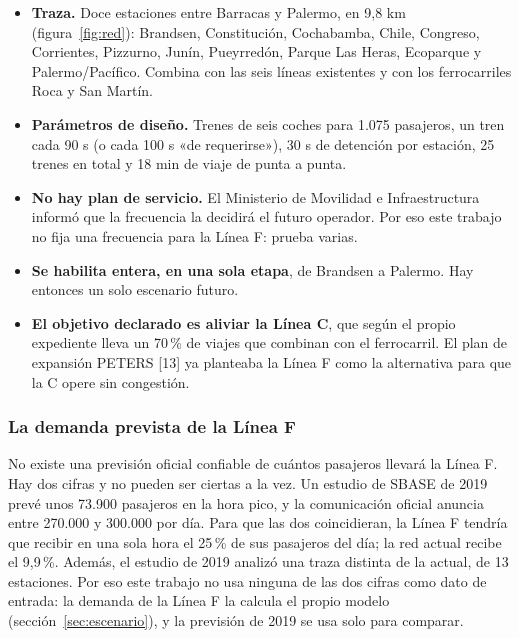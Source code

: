 \documentclass{article}
\begin{document}
\begin{itemize}
  \item \textbf{Traza.} Doce estaciones entre Barracas y Palermo, en 9,8 km (figura~\ref{fig:red}):
    Brandsen, Constitución, Cochabamba, Chile, Congreso, Corrientes, Pizzurno, Junín, Pueyrredón, Parque Las
    Heras, Ecoparque y Palermo/Pacífico. Combina con las seis líneas existentes y con los ferrocarriles Roca
    y San Martín.
  \item \textbf{Parámetros de diseño.} Trenes de seis coches para 1.075 pasajeros, un tren cada 90 s (o cada
    100 s «de requerirse»), 30 s de detención por estación, 25 trenes en total y 18 min de viaje de punta a
    punta.
  \item \textbf{No hay plan de servicio.} El Ministerio de Movilidad e Infraestructura informó que la
    frecuencia la decidirá el futuro operador. Por eso este trabajo no fija una frecuencia para la Línea F:
    prueba varias.
  \item \textbf{Se habilita entera, en una sola etapa}, de Brandsen a Palermo. Hay entonces un solo escenario
    futuro.
  \item \textbf{El objetivo declarado es aliviar la Línea C}, que según el propio expediente lleva un 70\,\%
    de viajes que combinan con el ferrocarril. El plan de expansión PETERS [13] ya planteaba la Línea F como
    la alternativa para que la C opere sin congestión.
\end{itemize}

\subsubsection{La demanda prevista de la Línea F}

No existe una previsión oficial confiable de cuántos pasajeros llevará la Línea F. Hay dos cifras y no
pueden ser ciertas a la vez. Un estudio de SBASE de 2019 prevé unos 73.900 pasajeros en la hora pico, y la
comunicación oficial anuncia entre 270.000 y 300.000 por día. Para que las dos coincidieran, la Línea F
tendría que recibir en una sola hora el 25\,\% de sus pasajeros del día; la red actual recibe el 9,9\,\%.
Además, el estudio de 2019 analizó una traza distinta de la actual, de 13 estaciones. Por eso este trabajo
no usa ninguna de las dos cifras como dato de entrada: la demanda de la Línea F la calcula el propio modelo
(sección~\ref{sec:escenario}), y la previsión de 2019 se usa solo para comparar.

\end{document}
